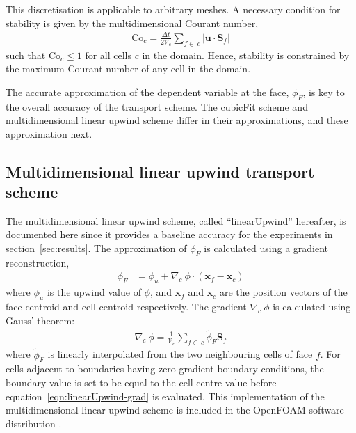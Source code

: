 This discretisation is applicable to arbitrary meshes.  A necessary condition for stability is given by the multidimensional Courant number,
\begin{align}
	\mathrm{Co}_c = \frac{\Delta t}{2 \mathcal{V}_c} \sum_{f \in\: c} \lvert \mathbf{u} \cdot \mathbf{S}_f \rvert
\end{align}
such that $\mathrm{Co}_c \leq 1$ for all cells $c$ in the domain.  Hence, stability is constrained by the maximum Courant number of any cell in the domain.

The accurate approximation of the dependent variable at the face, $\phi_F$, is key to the overall accuracy of the transport scheme. The cubicFit scheme and multidimensional linear upwind scheme differ in their approximations, and these approximation  next.




\subsection{Multidimensional linear upwind transport scheme}
The multidimensional linear upwind scheme, called ``linearUpwind'' hereafter, is documented here since it provides a baseline accuracy for the experiments in section~\ref{sec:results}.  The approximation of $\phi_F$ is calculated using a gradient reconstruction,
\begin{align}
	\phi_F &= \phi_u + \nabla_c\: \phi \cdot \left(\mathbf{x}_f - \mathbf{x}_c \right)
\end{align} 
where $\phi_u$ is the upwind value of $\phi$, and $\mathbf{x}_f$ and $\mathbf{x}_c$ are the position vectors of the face centroid and cell centroid respectively.
The gradient $\nabla_c \:\phi$ is calculated using Gauss' theorem:
\begin{align}
	\nabla_c\: \phi = \frac{1}{\mathcal{V}_c} \sum_{f\in\:c} \widetilde{\phi}_F \mathbf{S}_f \label{eqn:linearUpwind-grad}
\end{align}
where $\widetilde{\phi}_F$ is linearly interpolated from the two neighbouring cells of face $f$.  For cells adjacent to boundaries having zero gradient boundary conditions, the boundary value is set to be equal to the cell centre value before equation~\eqref{eqn:linearUpwind-grad} is evaluated.
This implementation of the multidimensional linear upwind scheme is included in the OpenFOAM software distribution \citep{openfoam}.

